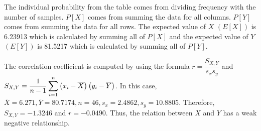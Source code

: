 The individual probability from the table comes from dividing frequency with the number of samples. $P[X]$ comes from summing the data for all columns. $P[Y]$ comes from summing the data for all rows. The expected value of $X$ $(E[X])$ is 6.23913 which is calculated by summing all of $P[X]$ and the expected value of $Y$ $(E[Y])$ is 81.5217 which is calculated by summing all of $P[Y]$.\\
\begin{figure}[ht!]
\end{figure}
The correlation coefficient is computed by using the formula \(r = \dfrac{S_{X, Y}}{s_xs_y}\) and \(S_{X, Y}=\dfrac{1}{n-1}\displaystyle\sum\limits^n_{i=1}\left(x_i-\overline{X}\right)\left(y_i-\overline{Y}\right)\). In this case, \(\overline{X} = 6.271, \overline{Y} = 80.7174, n = 46, s_x = 2.4862, s_y = 10.8805\). Therefore, \(S_{X, Y} = -1.3246\) and \(r = -0.0490\). Thus, the relation between $X$ and $Y$ has a weak negative relationship.\\
